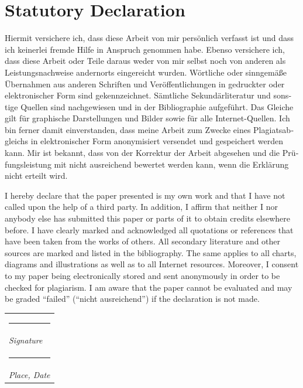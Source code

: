 \documentclass[11pt, a4paper]{article} %
\makeatletter
\newcommand{\signature}[2][5cm]{%
  \begin{tabular}{@{}p{#1}@{}}
    #2 \\[2\normalbaselineskip] \hrule \\[0pt]
    {\small \textit{Signature}} \\[2\normalbaselineskip] \hrule \\[0pt]
    {\small \textit{Place, Date}}
  \end{tabular}
}
\makeatother
\begin{document}
\blindtext %

\newpage %
\thispagestyle{empty} %
\section*{Statutory Declaration} %

\begin{otherlanguage}{german}
Hiermit versichere ich, dass diese Arbeit von mir pers\"{o}nlich verfasst ist und dass ich keinerlei fremde Hilfe in Anspruch genommen habe. Ebenso versichere ich, dass diese Arbeit oder Teile daraus weder von mir selbst noch von anderen als Leistungsnachweise andernorts eingereicht wurden. W\"{o}rtliche oder sinngem\"{a}{\ss}e \"{U}bernahmen aus anderen Schriften und Ver\"{o}ffentlichungen in gedruckter oder elektronischer Form sind gekennzeichnet. S\"{a}mtliche Sekund\"{a}rliteratur und sonstige Quellen sind nachgewiesen und in der Bibliographie aufgef\"{u}hrt. Das Gleiche gilt f\"{u}r graphische Darstellungen und Bilder sowie f\"{u}r alle Internet-Quellen. Ich bin ferner damit einverstanden, dass meine Arbeit zum Zwecke eines Plagiatsabgleichs in elektronischer Form anonymisiert versendet und gespeichert werden kann. Mir ist bekannt, dass von der Korrektur der Arbeit abgesehen und die Pr\"{u}fungsleistung mit nicht ausreichend bewertet werden kann, wenn die Erkl\"{a}rung nicht erteilt wird.
\end{otherlanguage}

\vspace*{1in} %

\noindent I hereby declare that the paper presented is my own work and that I have not called upon the help of a third party. In addition, I affirm that neither I nor anybody else has submitted this paper or parts of it to obtain credits elsewhere before. I have clearly marked and acknowledged all quotations or references that have been taken from the works of others. All secondary literature and other sources are marked and listed in the bibliography. The same applies to all charts, diagrams and illustrations as well as to all Internet resources. Moreover, I consent to my paper being electronically stored and sent anonymously in order to be checked for plagiarism. I am aware that the paper cannot be evaluated and may be graded ``failed'' (``nicht ausreichend'') if the declaration is not made.\\


\hfill \signature{} 


\end{document}
